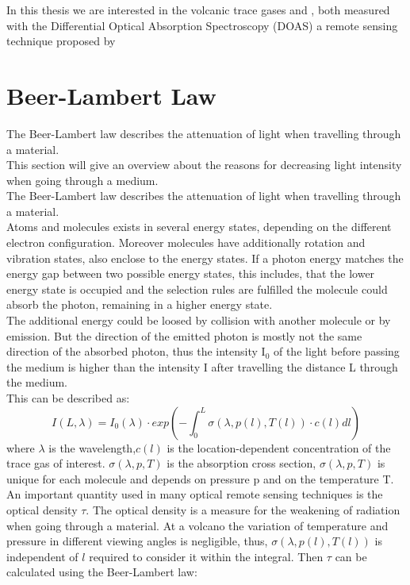 \documentclass  [
  paper    = a4,
  BCOR     = 10mm,
  twoside,
  fontsize = 12pt,
  fleqn,
  toc      = bibnumbered,
  toc      = listofnumbered,
  numbers  = noendperiod,
  headings = normal,
  listof   = leveldown,
  version  = 3.03
]                                       {scrreprt}
\begin{document}
	In this thesis we are interested in the volcanic trace gases  and , both measured with the Differential Optical Absorption Spectroscopy (DOAS) a remote sensing technique proposed by \citet{platt1980observations}

	

	\section*{Beer-Lambert Law}
	The Beer-Lambert law describes the attenuation of light when travelling through a material.\\
	This section will give an overview about the reasons for decreasing light intensity when going through a medium.\\
	The Beer-Lambert law describes the attenuation of light when travelling through a material.\\
%
	Atoms and molecules exists in several energy states, depending on the different electron configuration. Moreover molecules have additionally rotation and vibration states, also enclose to the energy states. If a photon energy matches the energy gap between two possible energy states, this includes, that the lower energy state is occupied and the selection rules are fulfilled  the molecule could absorb the photon, remaining in a higher energy state.\\
	The additional energy could be loosed by collision with another molecule or by emission. But the direction of the emitted photon is mostly not the same direction of the absorbed photon, thus the intensity I$_{0}$ of the light before passing the medium is higher than the intensity I after travelling the distance L through the medium.\\
	This can be described as:\\ 
	\begin{equation}
	I\left(L,\lambda\right) = I_{0}\left(\lambda\right)\cdot exp\left(-\int^{L}_{0}\sigma\left(\lambda,p(l),T(l)\right)\cdot c\left(l\right)dl\right)
	\end{equation}
	where $\lambda$ is the wavelength,$c\left(l\right)$ is the location-dependent concentration of the trace gas of interest. $\sigma\left(\lambda,p,T\right)$ is the absorption cross section, $\sigma\left(\lambda,p,T\right)$ is unique for each molecule and depends on pressure p and on the temperature T.\\
	An important quantity used in many optical remote sensing techniques is the optical density $\tau$. The optical density is a measure for the weakening of radiation when going through a material. At a volcano the variation of temperature and pressure in different viewing angles is negligible, thus, $\sigma\left(\lambda,p(l),T(l)\right)$ is independent of $l$ required to consider it within the integral. Then  $\tau$ can be calculated using the Beer-Lambert law:
\end{document}
